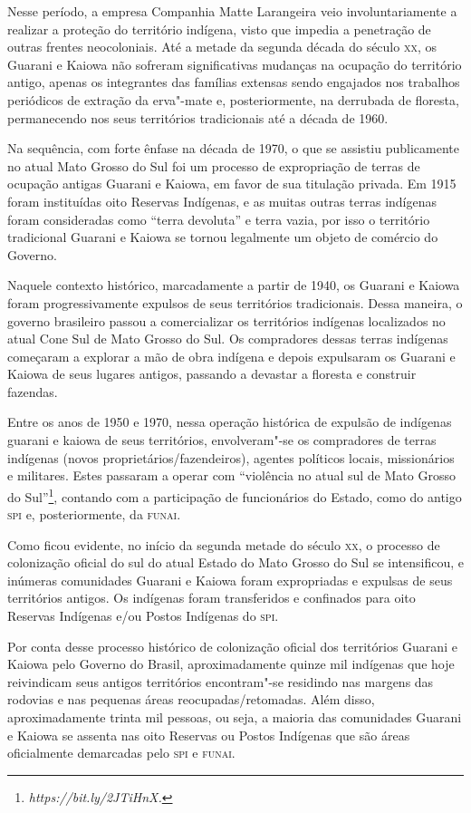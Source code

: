 Nesse período, a empresa Companhia Matte Larangeira veio
involuntariamente a realizar a proteção do território indígena, visto
que impedia a penetração de outras frentes neocoloniais. Até a metade
da segunda década do século \textsc{xx}, os Guarani e Kaiowa não sofreram
significativas mudanças na ocupação do território antigo, apenas os
integrantes das famílias extensas sendo engajados nos trabalhos
periódicos de extração da erva"-mate e, posteriormente, na derrubada de
floresta, permanecendo nos seus territórios tradicionais até a década
de 1960.

Na sequência, com forte ênfase na década de 1970, o que se assistiu
publicamente no atual Mato Grosso do Sul foi um processo de
expropriação de terras de ocupação antigas Guarani e Kaiowa, em favor
de sua titulação privada. Em 1915 foram instituídas oito Reservas
Indígenas, e as muitas outras terras indígenas foram consideradas como
``terra devoluta'' e terra vazia, por isso o território tradicional
Guarani e Kaiowa se tornou legalmente um objeto de comércio do Governo.


Naquele contexto histórico, marcadamente a partir de 1940, os Guarani e
Kaiowa foram progressivamente expulsos de seus territórios
tradicionais. Dessa maneira, o governo brasileiro passou a
comercializar os territórios indígenas localizados no atual Cone Sul de
Mato Grosso do Sul. Os compradores dessas terras indígenas começaram a
explorar a mão de obra indígena e depois expulsaram os Guarani e Kaiowa
de seus lugares antigos, passando a devastar a floresta e construir
fazendas.

Entre os anos de 1950 e 1970, nessa operação histórica de expulsão de
indígenas guarani e kaiowa de seus territórios, envolveram"-se os
compradores de terras indígenas (novos proprietários/fazendeiros),
agentes políticos locais, missionários e militares. Estes passaram a
operar com ``violência no atual sul de Mato Grosso do Sul''\footnote{\emph{https://bit.ly/2JTiHnX.}}, contando com a
participação de funcionários do Estado, como do antigo \textsc{spi} e,
posteriormente, da \textsc{funai}. 

Como ficou evidente, no início da segunda metade do século \textsc{xx}, o
processo de colonização oficial do sul do atual Estado do Mato Grosso
do Sul se intensificou, e inúmeras comunidades Guarani e Kaiowa foram
expropriadas e expulsas de seus territórios antigos. Os indígenas foram
transferidos e confinados para oito Reservas Indígenas e/ou Postos
Indígenas do \textsc{spi}. 

Por conta desse processo histórico de colonização oficial dos
territórios Guarani e Kaiowa pelo Governo do Brasil, aproximadamente
quinze mil indígenas que hoje reivindicam seus antigos territórios
encontram"-se residindo nas margens das rodovias e nas pequenas áreas
reocupadas/retomadas. Além disso, aproximadamente trinta mil pessoas,
ou seja, a maioria das comunidades Guarani e Kaiowa se assenta nas oito
Reservas ou Postos Indígenas que são áreas oficialmente demarcadas pelo
\textsc{spi} e \textsc{funai}. 

